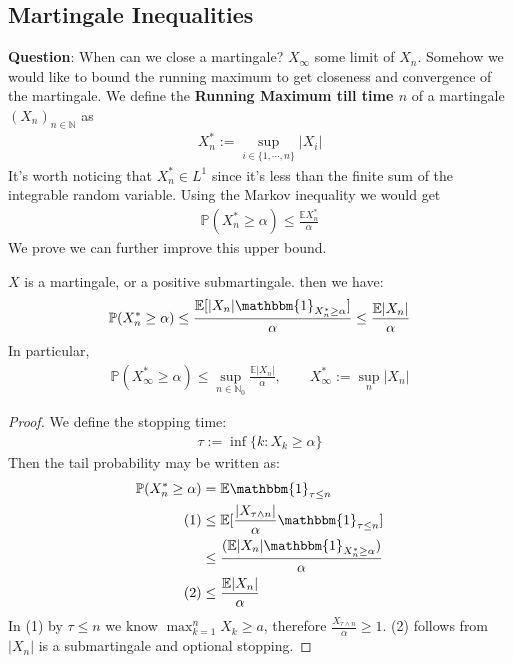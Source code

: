\subsection{Martingale Inequalities}
\textbf{Question}: When can we close a martingale? $X_\infty$ some limit of $X_n$. Somehow we would like to bound the running maximum to get closeness and convergence of the martingale. We define the \textbf{Running Maximum till time $n$} of a martingale $(X_n)_{n \in \mathbb{N}}$ as 
\begin{align*}
	X^*_n:= \sup_{i\in \{1, \cdots, n\}} |X_i|
\end{align*}
It's worth noticing that $X^*_n \in L^1$ since it's less than the finite sum of the integrable random variable.
Using the Markov inequality we would get
\begin{align*}
	\mathbb{P}(X^*_n \geq \alpha)\leq \frac{\mathbb{E}X^*_n}{\alpha}
\end{align*} 
We prove we can further improve this upper bound.

\begin{theorem}
$X$ is a martingale, or a positive submartingale. then we have:
\begin{align*}
	\mathbb{P}(X^*_n \geq \alpha) \leq \frac{\mathbb{E}[|X_n|\mathbbm{1}_{X^*_n \geq \alpha}]} {\alpha} \leq \frac{\mathbb{E}|X_n|}{\alpha}
\end{align*}	
In particular,
\begin{align*}
	\mathbb{P}(X_\infty^* \ge \alpha) \le \sup_{ n \in \mathbb{N}_0} \frac{\mathbb{E}|X_n|}{\alpha}, \qquad X_\infty^* := \sup_{n} |X_n|
\end{align*}
\end{theorem}
\begin{proof}
	We define the stopping time:
	\begin{align*}
		\tau:= \inf\{k: X_k \geq \alpha\}
	\end{align*}
	Then the tail probability may be written as:
	\begin{align*}
		\mathbb{P}(X^*_n \geq \alpha) &= \mathbb{E} \mathbbm{1}_{\tau \le n}\\
	(1)	&\leq \mathbb{E}[ \frac{|X_{\tau \wedge n}|}{\alpha}\mathbbm{1}_{\tau \le n}]\\
	&\leq \frac{ (\mathbb{E}|X_n| \mathbbm{1}_{X_n^* \ge \alpha})}{\alpha}  \\
	(2)	&\leq \frac{\mathbb{E}|X_n|}{\alpha}
	\end{align*}
	In (1) by $\tau \leq n $ we know $\max_{k = 1}^n X_k \geq a$, therefore $\frac{X_{\tau \wedge n}}{\alpha} \geq 1$. (2) follows from $|X_n|$ is a submartingale and optional stopping.
\end{proof}

